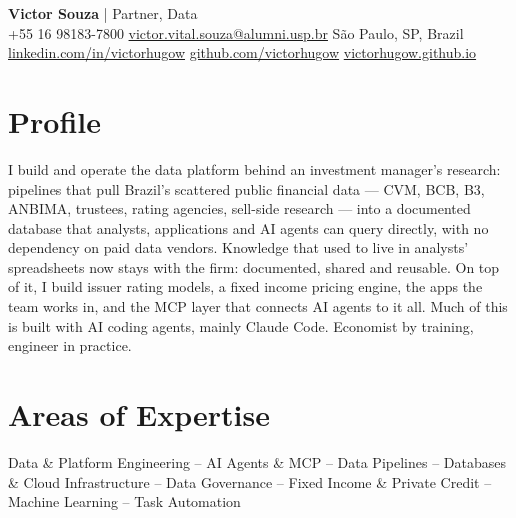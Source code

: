 \documentclass[10pt]{article}
\begin{document}
\begin{center}
{\LARGE\textbf{Victor Souza} | Partner, Data}\\[3pt]
+55 16 98183-7800 \quad \href{mailto:victor.vital.souza@alumni.usp.br}{victor.vital.souza@alumni.usp.br} \quad São Paulo, SP, Brazil\\
\href{https://linkedin.com/in/victorhugow}{linkedin.com/in/victorhugow} \quad \href{https://github.com/victorhugow}{github.com/victorhugow} \quad \href{https://victorhugow.github.io}{victorhugow.github.io}
\end{center}

\section*{Profile}
I build and operate the data platform behind an investment manager's research: pipelines that pull Brazil's scattered public financial data --- CVM, BCB, B3, ANBIMA, trustees, rating agencies, sell-side research --- into a documented database that analysts, applications and AI agents can query directly, with no dependency on paid data vendors. Knowledge that used to live in analysts' spreadsheets now stays with the firm: documented, shared and reusable. On top of it, I build issuer rating models, a fixed income pricing engine, the apps the team works in, and the MCP layer that connects AI agents to it all. Much of this is built with AI coding agents, mainly Claude Code. Economist by training, engineer in practice.

\section*{Areas of Expertise}
Data \& Platform Engineering -- AI Agents \& MCP -- Data Pipelines -- Databases \& Cloud Infrastructure -- Data Governance -- Fixed Income \& Private Credit -- Machine Learning -- Task Automation
\end{document}
